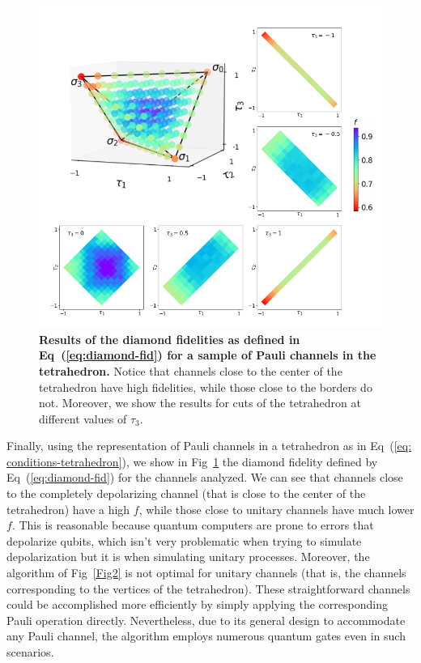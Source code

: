 \documentclass[10pt,letterpaper]{article} %
\newcommand{\fref}[1]{Fig~\ref{#1}}
\newcommand{\eref}[1]{Eq~(\ref{#1})}
\begin{document}
\begin{figure} %
\centering
\includegraphics{fig-tetra.pdf}
\caption{{\bf Results of the diamond fidelities as defined in \eref{eq:diamond-fid}
for a sample of Pauli channels in the tetrahedron.}  Notice that channels close
to the center of the tetrahedron have high fidelities, while those close to the
borders do not.  Moreover, we show the results for cuts of the tetrahedron at
different values of $\tau_3$.}
\label{Fig3}
\end{figure} %

Finally, using the representation of Pauli channels in a tetrahedron as in
\eref{eq: conditions-tetrahedron}, we show in \fref{Fig3} the diamond
fidelity defined by \eref{eq:diamond-fid} for the channels analyzed.  We can
see that channels close to the completely depolarizing channel (that is close
to the center of the tetrahedron) have a high $f$, while those close to unitary
channels have much lower $f$.   This is reasonable because quantum computers are
prone to errors that depolarize qubits, which isn't very problematic when
trying to simulate depolarization but it is when simulating unitary processes.
Moreover, the algorithm of \fref{Fig2} is not optimal for
unitary channels  (that is, the channels corresponding to the vertices of the
tetrahedron).  These straightforward channels could be accomplished more
efficiently by simply applying the corresponding Pauli operation directly. 
Nevertheless, due to its general design to accommodate any Pauli channel, the
algorithm employs numerous quantum gates even in such scenarios. 
\end{document}
